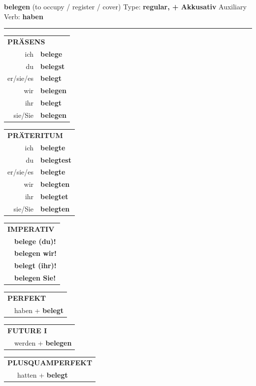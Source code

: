 \documentclass[10pt,a4paper]{revtex4-2}
\begin{document}
\begin{verbbox-acc}
{\Large \bf belegen} (to occupy / register / cover) \hfill Type: \textbf{regular, + Akkusativ} \hfill Auxiliary Verb: \textbf{haben}

\vspace{5pt}
\hrule
\vspace{5pt}

\begin{tabular}{rl}
\multicolumn{2}{l}{\textbf{PRÄSENS}}\\
ich & \textbf{belege}\\
du & \textbf{belegst}\\
er/sie/es & \textbf{belegt}\\
wir & \textbf{belegen}\\
ihr & \textbf{belegt}\\
sie/Sie & \textbf{belegen}\\
\end{tabular}
\hfill
\begin{tabular}{rl}
\multicolumn{2}{l}{\textbf{PRÄTERITUM}}\\
ich & \textbf{belegte}\\
du & \textbf{belegtest}\\
er/sie/es & \textbf{belegte}\\
wir & \textbf{belegten}\\
ihr & \textbf{belegtet}\\
sie/Sie & \textbf{belegten}\\
\end{tabular}
\hfill
\begin{tabular}{rl}
\multicolumn{2}{l}{\textbf{IMPERATIV}}\\
& \textbf{belege (du)!}\\
& \textbf{belegen wir!}\\
& \textbf{belegt (ihr)!}\\
& \textbf{belegen Sie!}\\
\end{tabular}

\vspace{10pt}

\begin{tabular}{rl}
\multicolumn{2}{l}{\textbf{PERFEKT}}\\
& haben + \textbf{belegt}\\
\end{tabular}
\hfill
\begin{tabular}{rl}
\multicolumn{2}{l}{\textbf{FUTURE I}}\\
& werden + \textbf{belegen}\\
\end{tabular}
\hfill
\begin{tabular}{rl}
\multicolumn{2}{l}{\textbf{PLUSQUAMPERFEKT}}\\
& hatten + \textbf{belegt}\\
\end{tabular}


\end{verbbox-acc}
\end{document}
